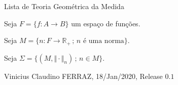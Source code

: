 \documentclass[12pt]{article}
\begin{document}
\Large

\begin{center}
Lista de Teoria Geom\'etrica da Medida
\end{center}

\normalsize

Seja $F = \{ f : A \to B \}$ um espa\c{c}o de fun\c{c}\~oes.

Seja $M = \{ n : F \to \mathbb{R}_+ \,;\,n\text{ \'e uma norma} \}$.

Seja $\Sigma = \{ (M, \Vert \cdot \Vert_n) \,;\, n \in M \}$.

\vspace{3mm}

Vinicius Claudino FERRAZ, 18/Jan/2020, Release $0.1$
\end{document}
